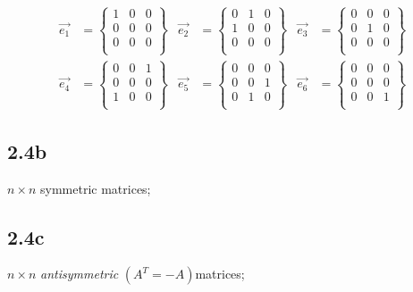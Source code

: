 \[
	\begin{aligned}
	\vec{e_{1}} &= \begin{Bmatrix}
		1 & 0 & 0 \\
		0 & 0 & 0 \\
		0 & 0 & 0 \\
	\end{Bmatrix} &
	\vec{e_{2}} &= \begin{Bmatrix}
		0 & 1 & 0 \\
		1 & 0 & 0 \\
		0 & 0 & 0 \\
	\end{Bmatrix} &
	\vec{e_{3}} &= \begin{Bmatrix}
		0 & 0 & 0 \\
		0 & 1 & 0 \\
		0 & 0 & 0 \\
	\end{Bmatrix} \\
	\vec{e_{4}} &= \begin{Bmatrix}
		0 & 0 & 1 \\
		0 & 0 & 0 \\
		1 & 0 & 0 \\
	\end{Bmatrix} &
	\vec{e_{5}} &= \begin{Bmatrix}
		0 & 0 & 0 \\
		0 & 0 & 1 \\
		0 & 1 & 0 \\
	\end{Bmatrix} &
	\vec{e_{6}} &= \begin{Bmatrix}
		0 & 0 & 0 \\
		0 & 0 & 0 \\
		0 & 0 & 1 \\
	\end{Bmatrix}
	\end{aligned}
\]

\subsection*{2.4b} $n \times n$ symmetric matrices;

\subsection*{2.4c} $n \times n$ \emph{antisymmetric} $\left( A^T = -A \right) $matrices;
